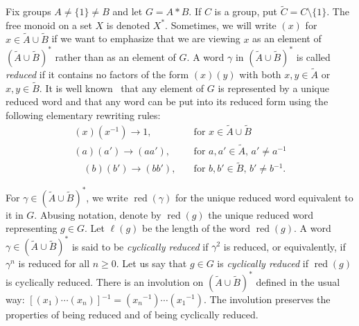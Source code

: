 \documentclass[11pt,reqno]{amsart}
\begin{document}
Fix groups $A\neq \{1\}\neq B$ and let $G=A\ast B$.  If $C$ is a group, put ${\ensuremath{\widetilde {C}}}=C\setminus \{1\}$. The free monoid on a set $X$ is denoted $X^*$.  Sometimes, we will write $(x)$ for $x\in {\ensuremath{\widetilde {A}}}\cup {\ensuremath{\widetilde {B}}}$ if we want to emphasize that we are viewing $x$ as an element of $({\ensuremath{\widetilde {A}}}\cup {\ensuremath{\widetilde {B}}})^*$ rather than as an element of $G$.  A word $\gamma$ in $({\ensuremath{\widetilde {A}}}\cup {\ensuremath{\widetilde {B}}})^*$ is called \emph{reduced} if it contains no factors of the form $(x)(y)$ with both $x,y\in {\ensuremath{\widetilde {A}}}$ or $x,y\in {\ensuremath{\widetilde {B}}}$.  It is well known~\cite[Chapter~IV, Theorem~1.2]{LyndonandSchupp} that any element of $G$ is represented by a unique reduced word and that any word can be put into its reduced form using the following elementary rewriting rules:
\begin{align}\label{rule1}
 (x)(x{^{-1}})\rightarrow 1, &\quad \text{for $x\in {\ensuremath{\widetilde {A}}}\cup {\ensuremath{\widetilde {B}}}$}\\ \label{rule2} (a)(a')\rightarrow (aa'), & \quad \text{for $a,a'\in {\ensuremath{\widetilde {A}}}$, $a'\neq a{^{-1}}$}\\ \quad \label{rule3} (b)(b')\rightarrow (bb'), &\quad \text{for $b,b'\in {\ensuremath{\widetilde {B}}}$, $b'\neq b{^{-1}}$.}
\end{align}

For $\gamma\in ({\ensuremath{\widetilde {A}}}\cup {\ensuremath{\widetilde {B}}})^*$, we write ${\mathop{\mathrm{red}}\nolimits}(\gamma)$ for the unique reduced word equivalent to it in $G$.  Abusing notation, denote by ${\mathop{\mathrm{red}}\nolimits}(g)$ the unique reduced word representing $g\in G$.  Let $\ell(g)$ be the length of the word ${\mathop{\mathrm{red}}\nolimits}(g)$. A word $\gamma\in ({\ensuremath{\widetilde {A}}}\cup {\ensuremath{\widetilde {B}}})^*$ is said to be \emph{cyclically reduced} if $\gamma^2$ is reduced, or equivalently, if $\gamma^n$ is reduced for all $n\geq 0$. Let us say that $g\in G$ is \emph{cyclically reduced} if ${\mathop{\mathrm{red}}\nolimits}(g)$ is cyclically reduced.  There is an involution on $({\ensuremath{\widetilde {A}}}\cup {\ensuremath{\widetilde {B}}})^*$ defined in the usual way: $[(x_1)\cdots (x_n)]{^{-1}} = (x_n{^{-1}})\cdots (x_1{^{-1}})$. The involution preserves the properties of being reduced and of being cyclically reduced.
\end{document}
